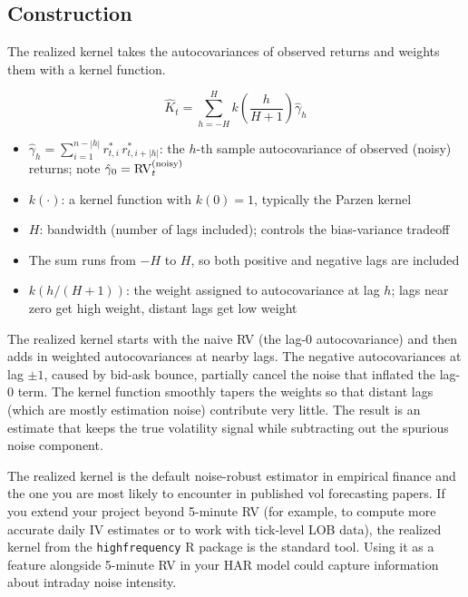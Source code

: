 \subsection{Construction}

The realized kernel takes the autocovariances of observed returns and weights them with a kernel function.

\begin{definition}
\begin{equation}
  \widehat{K}_t = \sum_{h=-H}^{H} k\!\left(\frac{h}{H+1}\right) \hat{\gamma}_h
  \label{eq:realized-kernel}
\end{equation}
\begin{itemize}[nosep]
  \item $\hat{\gamma}_h = \sum_{i=1}^{n-|h|} r^*_{t,i}\, r^*_{t,i+|h|}$: the $h$-th sample autocovariance of observed (noisy) returns; note $\hat{\gamma}_0 = \operatorname{RV}_t^{(\text{noisy})}$
  \item $k(\cdot)$: a kernel function with $k(0) = 1$, typically the Parzen kernel
  \item $H$: bandwidth (number of lags included); controls the bias-variance tradeoff
  \item The sum runs from $-H$ to $H$, so both positive and negative lags are included
  \item $k(h/(H+1))$: the weight assigned to autocovariance at lag $h$; lags near zero get high weight, distant lags get low weight
\end{itemize}
\end{definition}

\begin{intuition}
The realized kernel starts with the naive RV (the lag-0 autocovariance) and then adds in weighted autocovariances at nearby lags.
The negative autocovariances at lag $\pm 1$, caused by bid-ask bounce, partially cancel the noise that inflated the lag-0 term.
The kernel function smoothly tapers the weights so that distant lags (which are mostly estimation noise) contribute very little.
The result is an estimate that keeps the true volatility signal while subtracting out the spurious noise component.
\end{intuition}

\begin{projectconnection}
The realized kernel is the default noise-robust estimator in empirical finance and the one you are most likely to encounter in published vol forecasting papers.
If you extend your project beyond 5-minute RV (for example, to compute more accurate daily IV estimates or to work with tick-level LOB data), the realized kernel from the \texttt{highfrequency} R package is the standard tool.
Using it as a feature alongside 5-minute RV in your HAR model could capture information about intraday noise intensity.
\end{projectconnection}

